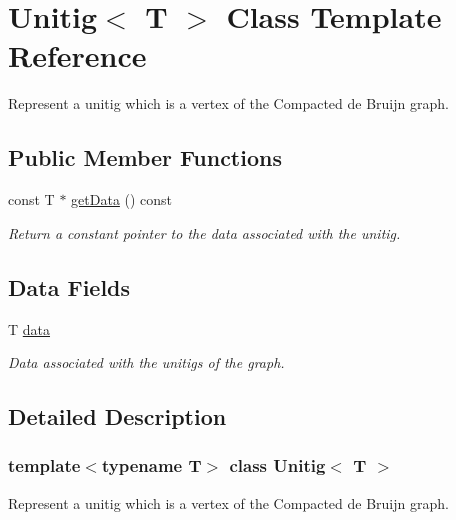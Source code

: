 \hypertarget{classUnitig}{}\section{Unitig$<$ T $>$ Class Template Reference}
\label{classUnitig}


Represent a unitig which is a vertex of the Compacted de Bruijn graph.  


\subsection*{Public Member Functions}
\begin{DoxyCompactItemize}
\item 
const T $\ast$ \hyperlink{classUnitig_a1627a06f59175d5f82646bb75d5484d3}{get\+Data} () const
\begin{DoxyCompactList}\small\item\em Return a constant pointer to the data associated with the unitig. \end{DoxyCompactList}\end{DoxyCompactItemize}
\subsection*{Data Fields}
\begin{DoxyCompactItemize}
\item 
\mbox{\label{classUnitig_aa337c8ec742de6c49ae246c27825d5eb}} 
T \hyperlink{classUnitig_aa337c8ec742de6c49ae246c27825d5eb}{data}
\begin{DoxyCompactList}\small\item\em Data associated with the unitigs of the graph. \end{DoxyCompactList}\end{DoxyCompactItemize}


\subsection{Detailed Description}
\subsubsection*{template$<$typename T$>$\newline
class Unitig$<$ T $>$}

Represent a unitig which is a vertex of the Compacted de Bruijn graph. 

